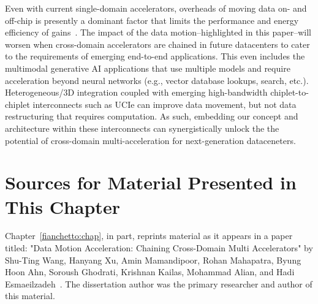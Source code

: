 Even with current single-domain accelerators, overheads of moving data on- and off-chip is presently a dominant factor that limits the performance and energy efficiency of gains~\cite{horowitz:isscc:2014, accelerator-cluster:hoti:2023}. 
%
The impact of the data motion--highlighted in this paper--will worsen when cross-domain accelerators are chained in future datacenters to cater to the requirements of emerging end-to-end applications.
%
This even includes the multimodal generative AI applications that use multiple models and require acceleration beyond neural networks (e.g., vector database lookups, search, etc.).
%
Heterogeneous/3D integration coupled with emerging high-bandwidth chiplet-to-chiplet interconnects such as UCIe can improve data movement, but not data restructuring that requires computation.
%
As such, embedding our \dmx concept and architecture within these interconnects can synergistically unlock the the potential of cross-domain multi-acceleration for next-generation dataceneters.

\section{Sources for Material Presented in This Chapter}
%
Chapter~\ref{fianchetto:chap}, in part, reprints material as it appears in a paper titled: "Data Motion Acceleration: Chaining Cross-Domain Multi Accelerators"
by Shu-Ting Wang, Hanyang Xu, Amin Mamandipoor, Rohan Mahapatra, Byung Hoon Ahn, 
Soroush Ghodrati, Krishnan Kailas, Mohammad Alian, and Hadi Esmaeilzadeh~\cite{dmx:hpca:2024}.
% 
The dissertation author was the primary researcher and author of this material.